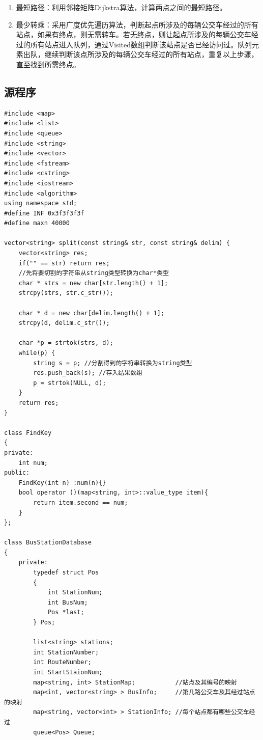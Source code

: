 \documentclass[a4paper,11pt,UTF8]{ctexart}
\begin{document}
\begin{enumerate}
   \item 最短路径：利用邻接矩阵Dijkstra算法，计算两点之间的最短路径。
   \item 最少转乘：采用广度优先遍历算法，判断起点所涉及的每辆公交车经过的所有站点，如果有终点，则无需转车。若无终点，则让起点所涉及的每辆公交车经过的所有站点进入队列，通过Visited数组判断该站点是否已经访问过。队列元素出队，继续判断该点所涉及的每辆公交车经过的所有站点，重复以上步骤，直至找到所需终点。
\end{enumerate}\par

\subsection{源程序}
\begin{lstlisting}[caption=BusRoute.cpp,captionpos=b]
#include <map>
#include <list>
#include <queue>
#include <string>
#include <vector>
#include <fstream>
#include <cstring>
#include <iostream>
#include <algorithm>
using namespace std;
#define INF 0x3f3f3f3f
#define maxn 40000

vector<string> split(const string& str, const string& delim) {
    vector<string> res;
    if("" == str) return res;
    //先将要切割的字符串从string类型转换为char*类型
    char * strs = new char[str.length() + 1];
    strcpy(strs, str.c_str());

    char * d = new char[delim.length() + 1];
    strcpy(d, delim.c_str());

    char *p = strtok(strs, d);
    while(p) {
        string s = p; //分割得到的字符串转换为string类型
        res.push_back(s); //存入结果数组
        p = strtok(NULL, d);
    }
    return res;
}

class FindKey
{
private:
    int num;
public:
    FindKey(int n) :num(n){}
    bool operator ()(map<string, int>::value_type item){
        return item.second == num;
    }
};

class BusStationDatabase
{
    private:
        typedef struct Pos
        {
            int StationNum;
            int BusNum;
            Pos *last;
        } Pos;

        list<string> stations;
        int StationNumber;
        int RouteNumber;
        int StartStaionNum;
        map<string, int> StationMap;           //站点及其编号的映射
        map<int, vector<string> > BusInfo;     //第几路公交车及其经过站点的映射
        map<string, vector<int> > StationInfo; //每个站点都有哪些公交车经过
        queue<Pos> Queue;


\end{lstlisting}
\end{document}
